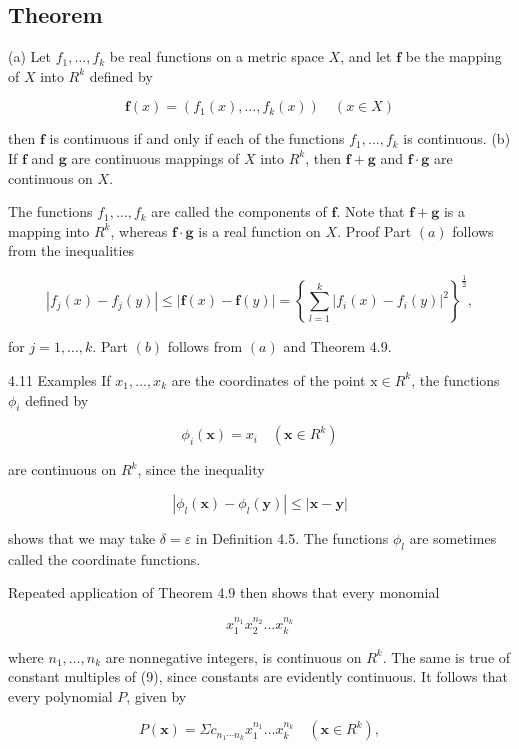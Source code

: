 \documentclass[10pt]{article}
\begin{document}
\subsection{Theorem}
(a) Let $f_{1}, \ldots, f_{k}$ be real functions on a metric space $X$, and let $\mathbf{f}$ be the mapping of $X$ into $R^{k}$ defined by

$$
\mathbf{f}(x)=\left(f_{1}(x), \ldots, f_{k}(x)\right) \quad(x \in X)
$$

then $\mathbf{f}$ is continuous if and only if each of the functions $f_{1}, \ldots, f_{k}$ is continuous. (b) If $\mathbf{f}$ and $\mathbf{g}$ are continuous mappings of $X$ into $R^{k}$, then $\mathbf{f}+\mathbf{g}$ and $\mathbf{f} \cdot \mathbf{g}$ are continuous on $X$.

The functions $f_{1}, \ldots, f_{k}$ are called the components of $\mathbf{f}$. Note that $\mathbf{f}+\mathbf{g}$ is a mapping into $R^{k}$, whereas $\mathbf{f} \cdot \mathbf{g}$ is a real function on $X$. Proof Part $(a)$ follows from the inequalities

$$
\left|f_{j}(x)-f_{j}(y)\right| \leq|\mathbf{f}(x)-\mathbf{f}(y)|=\left\{\sum_{l=1}^{k}\left|f_{i}(x)-f_{i}(y)\right|^{2}\right\}^{\frac{1}{2}},
$$

for $j=1, \ldots, k$. Part $(b)$ follows from $(a)$ and Theorem 4.9.

4.11 Examples If $x_{1}, \ldots, x_{k}$ are the coordinates of the point $\mathrm{x} \in R^{k}$, the functions $\phi_{i}$ defined by

$$
\phi_{i}(\mathbf{x})=x_{i} \quad\left(\mathbf{x} \in R^{k}\right)
$$

are continuous on $R^{k}$, since the inequality

$$
\left|\phi_{l}(\mathbf{x})-\phi_{l}(\mathbf{y})\right| \leq|\mathbf{x}-\mathbf{y}|
$$

shows that we may take $\delta=\varepsilon$ in Definition 4.5. The functions $\phi_{l}$ are sometimes called the coordinate functions.

Repeated application of Theorem 4.9 then shows that every monomial

$$
x_{1}^{n_{1}} x_{2}^{n_{2}} \ldots x_{k}^{n_{k}}
$$

where $n_{1}, \ldots, n_{k}$ are nonnegative integers, is continuous on $R^{k}$. The same is true of constant multiples of (9), since constants are evidently continuous. It follows that every polynomial $P$, given by

$$
P(\mathbf{x})=\Sigma c_{n_{1} \cdots n_{k}} x_{1}^{n_{1}} \ldots x_{k}^{n_{k}} \quad\left(\mathbf{x} \in R^{k}\right),
$$
\end{document}
